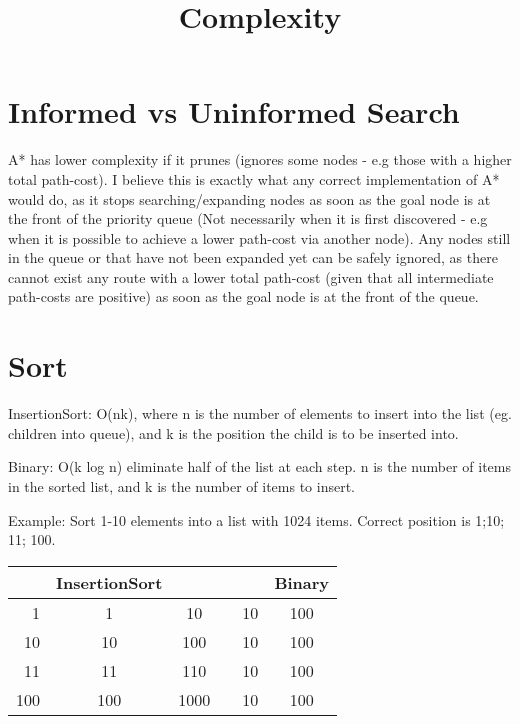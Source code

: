 \documentclass[conference]{IEEEtran}%
\title{Complexity}
\author{\IEEEauthorblockN{jok13}}
\begin{document}
	\maketitle
	\nocite{*}%
	\IEEEpeerreviewmaketitle
	

\section{Informed vs Uninformed Search}
A* has lower complexity if it prunes (ignores some nodes - e.g those with a higher total path-cost). I believe this is exactly what any correct implementation of A* would do, as it stops searching/expanding nodes as soon as the goal node is at the front of the priority queue (Not necessarily when it is first discovered - e.g when it is possible to achieve a lower path-cost via another node). Any nodes still in the queue or that have not been expanded yet can be safely ignored, as there cannot exist any route with a lower total path-cost (given that all intermediate path-costs are positive) as soon as the goal node is at the front of the queue.

\section{Sort}
InsertionSort: O(nk), where n is the number of elements to insert into the list (eg. children into queue), and k is the position the child is to be inserted into.

Binary: O(k log n) eliminate half of the list at each step. n is the number of items in the sorted list, and k is the number of items to insert.

Example: Sort 1-10 elements into a list with 1024 items. Correct position is 1;10; 11; 100.
\begin{tabular}{|r|c|c|c|c|c|}
	\hline 
	\rule[-1ex]{0pt}{2.5ex}
	&InsertionSort &&&& Binary  \\ 
	\hline 
	\rule[-1ex]{0pt}{2.5ex} 1&1 & 10 && 10 & 100 \\ 
	\hline 
	\rule[-1ex]{0pt}{2.5ex} 10&10 & 100 && 10 & 100 \\ 
	\hline 
	\rule[-1ex]{0pt}{2.5ex} 11&11 & 110 && 10 & 100 \\ 
	\hline 
	\rule[-1ex]{0pt}{2.5ex} 100&100 & 1000 && 10 & 100 \\ 
	\hline 
\end{tabular}\\
\end{document}
